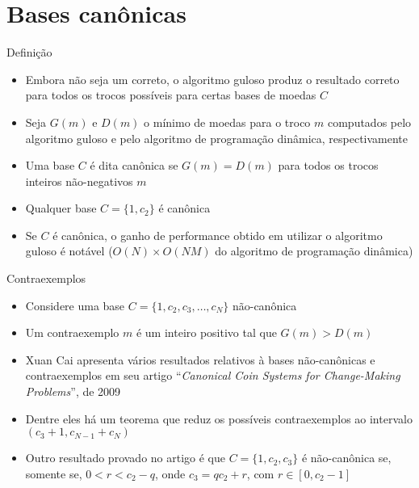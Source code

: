 \section{Bases canônicas}

\begin{frame}[fragile]{Definição}

    \begin{itemize}
        \item Embora não seja um correto, o algoritmo guloso produz o resultado correto para todos
            os trocos possíveis para certas bases de moedas $C$

        \item Seja $G(m)$ e $D(m)$ o mínimo de moedas para o troco $m$ computados pelo algoritmo 
            guloso e pelo algoritmo de programação dinâmica, respectivamente
            
        \item Uma base $C$ é dita canônica se $G(m) = D(m)$ para todos os trocos inteiros
            não-negativos $m$

        \item Qualquer base $C = \{ 1, c_2 \}$ é canônica

        \item Se $C$ é canônica, o ganho de performance obtido em utilizar o algoritmo guloso
            é notável ($O(N) \times O(NM)$ do algoritmo de programação dinâmica)
    \end{itemize}

\end{frame}

\begin{frame}[fragile]{Contraexemplos}

    \begin{itemize}
        \item Considere uma base $C = \{ 1, c_2, c_3, \ldots, c_N \}$ não-canônica

        \item Um contraexemplo $m$ é um inteiro positivo tal que $G(m) > D(m)$

        \item Xuan Cai apresenta vários resultados relativos à bases não-canônicas e contraexemplos
            em seu artigo ``\textit{Canonical Coin Systems for Change-Making Problems}'', de 2009

        \item Dentre eles há um teorema que reduz os possíveis contraexemplos ao 
            intervalo $(c_3 + 1, c_{N - 1} + c_N)$

        \item Outro resultado provado no artigo é que $C = \{ 1, c_2, c_3 \}$ é não-canônica se,
            somente se, $0 < r < c_2 - q$, onde $c_3 = qc_2 + r$, com $r \in [0, c_2 - 1]$
    \end{itemize}

\end{frame}


